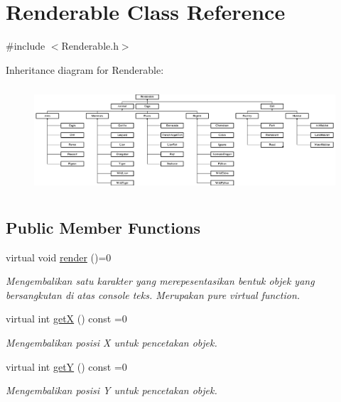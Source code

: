 \hypertarget{classRenderable}{\section{Renderable Class Reference}
\label{classRenderable}
}


{\ttfamily \#include $<$Renderable.\+h$>$}

Inheritance diagram for Renderable\+:\begin{figure}[H]
\begin{center}
\leavevmode
\includegraphics[height=3.954802cm]{classRenderable}
\end{center}
\end{figure}
\subsection*{Public Member Functions}
\begin{DoxyCompactItemize}
\item 
\hypertarget{classRenderable_a7d02709d871bd2bde97d41d933df5adf}{virtual void \hyperlink{classRenderable_a7d02709d871bd2bde97d41d933df5adf}{render} ()=0}\label{classRenderable_a7d02709d871bd2bde97d41d933df5adf}

\begin{DoxyCompactList}\small\item\em Mengembalikan satu karakter yang merepesentasikan bentuk objek yang bersangkutan di atas console teks. Merupakan pure virtual function. \end{DoxyCompactList}\item 
\hypertarget{classRenderable_af0e3e758db2aad1d0d874fc98736614f}{virtual int \hyperlink{classRenderable_af0e3e758db2aad1d0d874fc98736614f}{get\+X} () const =0}\label{classRenderable_af0e3e758db2aad1d0d874fc98736614f}

\begin{DoxyCompactList}\small\item\em Mengembalikan posisi X untuk pencetakan objek. \end{DoxyCompactList}\item 
\hypertarget{classRenderable_a6af0fc98ab82083dce18e9ea970480e0}{virtual int \hyperlink{classRenderable_a6af0fc98ab82083dce18e9ea970480e0}{get\+Y} () const =0}\label{classRenderable_a6af0fc98ab82083dce18e9ea970480e0}

\begin{DoxyCompactList}\small\item\em Mengembalikan posisi Y untuk pencetakan objek. \end{DoxyCompactList}\end{DoxyCompactItemize}



